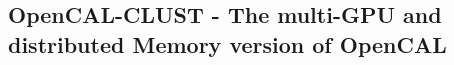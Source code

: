 
\subsection[OpenCAL-CLUST]{OpenCAL-CLUST - The multi-GPU and distributed Memory version of OpenCAL} 
